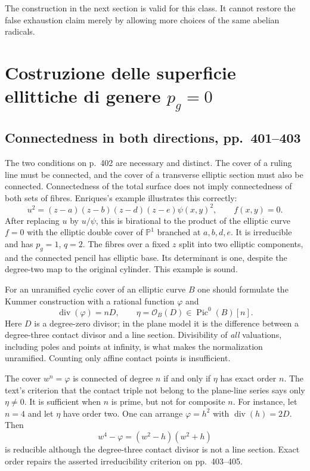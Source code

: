 The construction in the next section is valid for this class. It cannot restore the false exhaustion claim merely by allowing more choices of the same abelian radicals.

\section{Costruzione delle superficie ellittiche di genere \texorpdfstring{$p_g=0$}{pg=0}}
\label{cp2-x-13}

\subsection{Connectedness in both directions, pp.~401--403}

The two conditions on p.~402 are necessary and distinct. The cover of a ruling line must be connected, and the cover of a transverse elliptic section must also be connected. Connectedness of the total surface does not imply connectedness of both sets of fibres. Enriques's example illustrates this correctly:
\[
 u^2=(z-a)(z-b)(z-d)(z-e)\psi(x,y)^2,
 \qquad f(x,y)=0.
\]
After replacing $u$ by $u/\psi$, this is birational to the product of the elliptic curve $f=0$ with the elliptic double cover of $\mathbb P^1$ branched at $a,b,d,e$. It is irreducible and has $p_g=1$, $q=2$. The fibres over a fixed $z$ split into two elliptic components, and the connected pencil has elliptic base. Its determinant is one, despite the degree-two map to the original cylinder. This example is sound.

For an unramified cyclic cover of an elliptic curve $B$ one should formulate the Kummer construction with a rational function $\varphi$ and
\[
 \operatorname{div}(\varphi)=nD,
 \qquad\eta=\mathcal O_B(D)\in\operatorname{Pic}^0(B)[n].
\]
Here $D$ is a degree-zero divisor; in the plane model it is the difference between a degree-three contact divisor and a line section. Divisibility of \emph{all} valuations, including poles and points at infinity, is what makes the normalization unramified. Counting only affine contact points is insufficient.

The cover $w^n=\varphi$ is connected of degree $n$ if and only if $\eta$ has exact order $n$. The text's criterion that the contact triple not belong to the plane-line series says only $\eta\ne0$. It is sufficient when $n$ is prime, but not for composite $n$. For instance, let $n=4$ and let $\eta$ have order two. One can arrange $\varphi=h^2$ with $\operatorname{div}(h)=2D$. Then
\[
 w^4-\varphi=(w^2-h)(w^2+h)
\]
is reducible although the degree-three contact divisor is not a line section. Exact order repairs the asserted irreducibility criterion on pp.~403--405.

